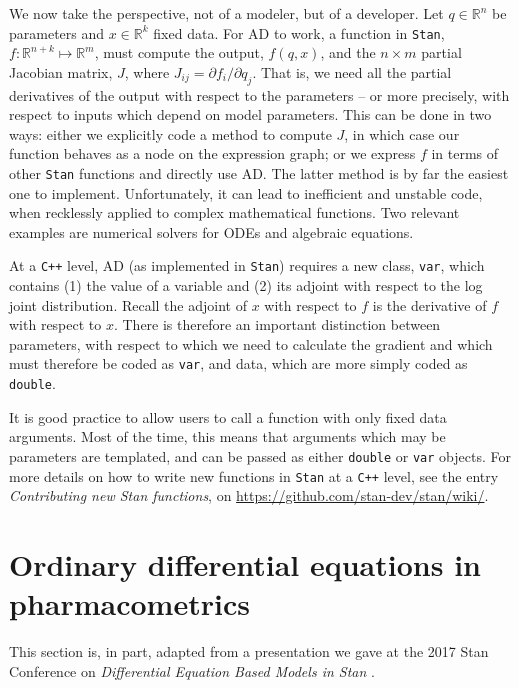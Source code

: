 \documentclass[11pt]{article}
\begin{document}
  We now take the perspective, not of a modeler, but of a developer.
  Let $q \in \mathbb{R}^n$ be parameters and $x \in \mathbb{R}^k$ fixed data. 
  For AD to work, a function in \texttt{Stan}, $f: \mathbb{R}^{n + k} \mapsto \mathbb{R}^m$, 
  must compute the output, $f(q, x)$, and the $n \times m$ partial Jacobian matrix, $J$, 
  where $J_{ij} = \partial f_i / \partial q_j$. That is, we need all the partial derivatives of
  the output with respect to the parameters -- or more precisely, with respect to inputs
  which depend on model parameters.
  This can be done in two ways: either we explicitly code a method to compute $J$,
  in which case our function behaves as a node on the expression graph;
  or we express $f$ in terms of other \texttt{Stan} functions and directly use AD. 
  The latter method is by far the easiest one to implement.
  Unfortunately, it can lead to inefficient and unstable code, when recklessly applied
  to complex mathematical functions. Two relevant examples are numerical solvers for
  ODEs and algebraic equations.
  
  At a \texttt{C++} level, AD (as implemented in \texttt{Stan}) requires a new class, \texttt{var}, which
  contains (1) the value of a variable and (2) its adjoint with respect to the log 
  joint distribution. Recall the adjoint of $x$ with respect to $f$ is the derivative of $f$
  with respect to $x$. There is therefore an important distinction between parameters,
  with respect to which we need to calculate the gradient and 
  which must therefore be coded as \texttt{var}, and data, which are more simply 
  coded as \texttt{double}.

 It is good practice to allow users to call a function with only fixed data arguments.
 Most of the time, this means that arguments which may be parameters are templated, 
 and can be passed as either \texttt{double} or \texttt{var} objects.
 For more details on how to write new functions in \texttt{Stan} at a \texttt{C++}
 level, see the entry \textit{Contributing new Stan functions}, 
 on \url{https://github.com/stan-dev/stan/wiki/}.
 
 \section{Ordinary differential equations in pharmacometrics}
  
  This section is, in part, adapted from a presentation we gave at the 2017 Stan 
  Conference on \textit{Differential Equation Based Models in Stan} \cite{Margossian:2017}.
  
\end{document}
